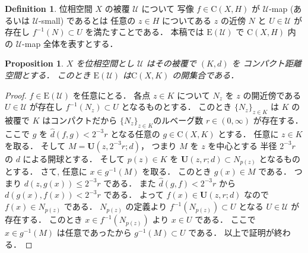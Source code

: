 \documentclass[leqno, a4paper, 12pt]{jsarticle}
\theoremstyle{plain}
\newtheorem{prop}[thm]{Proposition}
\theoremstyle{definition}
\newtheorem{df}{Definition}[section]
\theoremstyle{remark}
\newcommand{\yocovf}[1]{\mathscr{#1}}
\newcommand{\yosupmet}[1]{\widehat{#1}}
\newcommand{\yofuncsp}[2]{\mathrm{C}(#1, #2)}
\newcommand{\yofsusm}[1]{\mathrm{E}(#1)}
\newcommand{\yoballfont}{\mathbf}
\newcommand{\yometoball}[3]{\yoballfont{U}(#1, #2; #3)}
\numberwithin{equation}{section}
\begin{document}
\begin{df}
位相空間
$X$
の被覆
$\yocovf{U}$
について
写像
$f\in \yofuncsp{X}{H}$
が
$\yocovf{U}$-map
(あるいは
$\yocovf{U}$-small)
であるとは
任意の
$z\in H$
についてある
$z$
の近傍
$N$
と
$U\in \yocovf{U}$
が存在し
$f^{-1}(N)\subset U$
を満たすことである．
本稿では
$\yofsusm{\yocovf{U}}$
で
$\yofuncsp{X}{H}$
内の
$\yocovf{U}$-map
全体を表すとする．
\end{df}

\begin{prop}\label{prop:smallopen}
$X$
を位相空間とし
$\yocovf{U}$
はその被覆で
$(K, d)$
を
コンパクト距離空間とする．
このとき
$\yofsusm{\yocovf{U}}$
は$\yofuncsp{X}{K}$
の開集合である．
\end{prop}
\begin{proof}
$f\in \yofsusm{\yocovf{U}}$
を任意にとる．
各点
$z\in K$
について
$N_{z}$
を
$z$
の開近傍である
$U\in \yocovf{U}$
が存在し
$f^{-1}(N_{z})\subset U$
となるものとする．
このとき
$\{N_{z}\}_{z\in K}$
は
$K$
の被覆で
$K$
はコンパクトだから
$\{N_{z}\}_{z\in K}$のルベーグ数
$r\in (0, \infty)$
が存在する．
ここで
$g$
を
$\yosupmet{d}(f, g)<2^{-3}r$
となる任意の
$g\in \yofuncsp{X}{K}$
とする．
任意に
$z\in K$
を取る．
そして
$M=\yometoball{z}{2^{-3}r}{d}$，
つまり
$M$
を
$z$
を中心とする
半径
$2^{-3}r$
の
$d$
による開球とする．
そして
$p(z)\in K$
を
$\yometoball{z}{r}{d}\subset N_{p(z)}$
となるものとする．
さて,
任意に
$x\in g^{-1}(M)$
を取る．
このとき
$g(x)\in M$
である．
つまり
$d(z, g(x))\le 2^{-3}r$
である．
また
$\yosupmet{d}(g, f)<2^{-3}r$
から
$d(g(x), f(x))<2^{-3}r$
である．
よって
$f(x)\in \yometoball{z}{r}{d}$
なので
$f(x)\in N_{p(z)}$
である．
$N_{p(z)}$
の定義より
$f^{-1}(N_{p(z)})\subset U$
となる
$U\in \yocovf{U}$
が存在する．
このとき
$x\in f^{-1}(N_{p(z)})$
より
$x\in U$
である．
ここで$x\in g^{-1}(M)$
は任意であったから
$g^{-1}(M)\subset U$
である．
以上で証明が終わる．
\end{proof}
\end{document}
